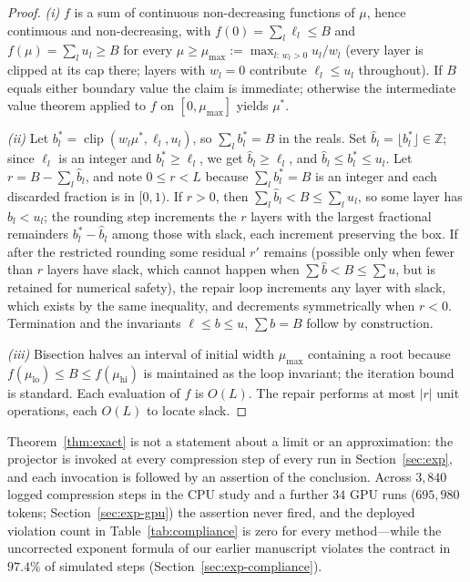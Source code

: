 \begin{proof}
\emph{(i)} $f$ is a sum of continuous non-decreasing functions of $\mu$,
hence continuous and non-decreasing, with
$f(0)=\sum_l\ell_l\le B$ and
$f(\mu)=\sum_l u_l\ge B$ for every
$\mu\ge\mu_{\max}:=\max_{l:\,w_l>0} u_l/w_l$ (every layer is clipped at
its cap there; layers with $w_l=0$ contribute $\ell_l\le u_l$ throughout).
If $B$ equals either boundary value the claim is immediate; otherwise the
intermediate value theorem applied to $f$ on $[0,\mu_{\max}]$ yields
$\mu^{*}$.

\emph{(ii)} Let $b^{*}_l=\operatorname{clip}(w_l\mu^{*},\ell_l,u_l)$, so
$\sum_l b^{*}_l=B$ in the reals. Set
$\hat b_l=\lfloor b^{*}_l\rfloor\in\mathbb{Z}$; since $\ell_l$ is an
integer and $b^{*}_l\ge\ell_l$, we get $\hat b_l\ge \ell_l$, and $\hat
b_l\le b^{*}_l\le u_l$. Let $r=B-\sum_l\hat b_l$, and note
$0\le r< L$ because $\sum_l b^{*}_l=B$ is an integer and each discarded
fraction is in $[0,1)$. If $r>0$, then $\sum_l\hat b_l<B\le\sum_l u_l$,
so some layer has $\hat b_l<u_l$; the rounding step increments the $r$
layers with the largest fractional remainders $b^{*}_l-\hat b_l$ among
those with slack, each increment preserving the box. If after the
restricted rounding some residual $r'$ remains (possible only when
fewer than $r$ layers have slack, which cannot happen when
$\sum\hat b<B\le\sum u$, but is retained for numerical safety), the
repair loop increments any layer with slack, which exists by the same
inequality, and decrements symmetrically when $r<0$. Termination and the
invariants $\ell\le b\le u$, $\sum b=B$ follow by construction.

\emph{(iii)} Bisection halves an interval of initial width $\mu_{\max}$
containing a root because $f(\mu_{\mathrm{lo}})\le B\le
f(\mu_{\mathrm{hi}})$ is maintained as the loop invariant; the iteration
bound is standard. Each evaluation of $f$ is $O(L)$. The repair performs
at most $|r|$ unit operations, each $O(L)$ to locate slack.
\end{proof}

\begin{remark}
Theorem~\ref{thm:exact} is not a statement about a limit or an
approximation: the projector is invoked at every compression step of every
run in Section~\ref{sec:exp}, and each invocation is followed by an
assertion of the conclusion. Across $3{,}840$ logged compression steps
in the CPU study and a further $34$ GPU runs ($695{,}980$ tokens;
Section~\ref{sec:exp-gpu}) the assertion never fired,
and the deployed violation count in Table~\ref{tab:compliance} is zero
for every method---while the uncorrected exponent formula of our earlier
manuscript violates the contract in $97.4\%$ of simulated steps
(Section~\ref{sec:exp-compliance}).
\end{remark}

